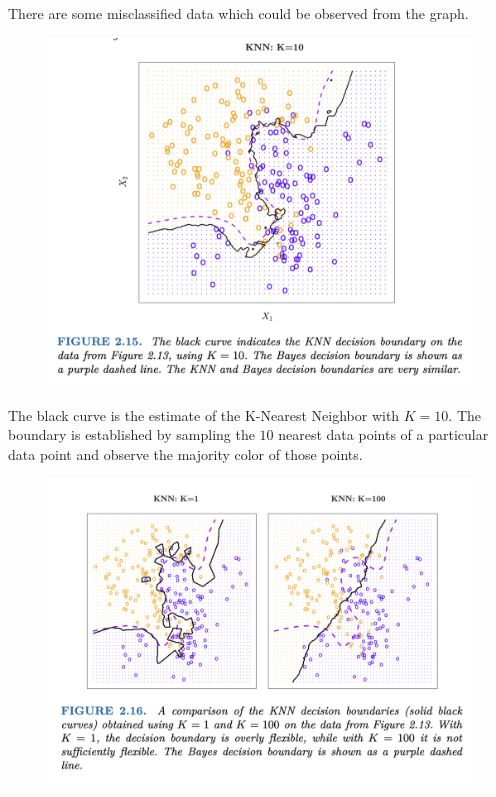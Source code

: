 \documentclass{article}
\begin{document}
There are some misclassified data which could be observed from the graph.

\newpage

\begin{figure}[h!]
    \centering
    \includegraphics[width=0.5\linewidth]{KNN_10.png}
    \label{fig:KNN-10}
\end{figure}

The black curve is the estimate of the K-Nearest Neighbor with $K = 10$. The boundary is established by sampling the $10$ nearest data points of a particular data point and observe the majority color of those points.

\begin{figure}[h!]
    \centering
    \includegraphics[width=0.75\linewidth]{KNN_compare.png}
    \label{fig:KNN-compare-1-100}
\end{figure}
\end{document}
